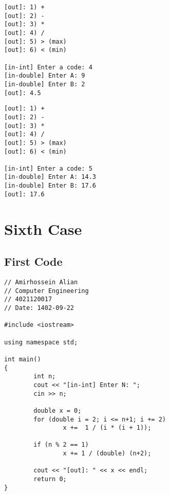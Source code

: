 \documentclass[12pt]{article}
\begin{document}
    \begin{tcolorbox}[breakable, size=fbox, boxrule=1pt, pad at break*=1mm, colback=cellbackground!5!white, colframe=gray!75!black, title=Test Case 2]
\begin{Verbatim}[commandchars=\\\{\}]
[out]: 1) +
[out]: 2) -
[out]: 3) *
[out]: 4) /
[out]: 5) > (max)
[out]: 6) < (min)

[in-int] Enter a code: 4
[in-double] Enter A: 9
[in-double] Enter B: 2
[out]: 4.5
\end{Verbatim}
\end{tcolorbox}

    \begin{tcolorbox}[breakable, size=fbox, boxrule=1pt, pad at break*=1mm, colback=cellbackground!5!white, colframe=gray!75!black, title=Test Case 3]
\begin{Verbatim}[commandchars=\\\{\}]
[out]: 1) +
[out]: 2) -
[out]: 3) *
[out]: 4) /
[out]: 5) > (max)
[out]: 6) < (min)

[in-int] Enter a code: 5
[in-double] Enter A: 14.3
[in-double] Enter B: 17.6
[out]: 17.6
\end{Verbatim}
\end{tcolorbox}

\pagebreak

  \section{Sixth Case}
        \subsection{First Code}
   \begin{tcolorbox}[breakable, size=fbox, boxrule=1pt, pad at break*=1mm, colback=cellbackground, colframe=cellborder]
\begin{verbatim}
// Amirhossein Alian
// Computer Engineering
// 4021120017
// Date: 1402-09-22

#include <iostream>

using namespace std;

int main()
{
        int n;
        cout << "[in-int] Enter N: ";
        cin >> n;

        double x = 0;
        for (double i = 2; i <= n+1; i += 2)
                x +=  1 / (i * (i + 1));
        
        if (n % 2 == 1)
                x += 1 / (double) (n+2);
        
        cout << "[out]: " << x << endl;
        return 0;
}
\end{verbatim}
\end{tcolorbox}
\end{document}
